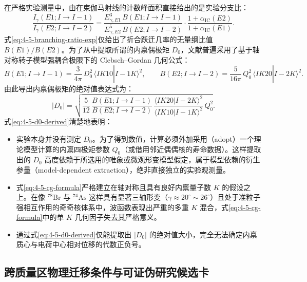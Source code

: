在严格实验测量中，由在束伽马射线的计数峰面积直接给出的是实验分支比：
\begin{equation}\label{eq:4-5-branching-ratio-exp}
\frac{I_\gamma(E1; I \to I-1)}{I_\gamma(E2; I \to I-2)} = \frac{E_{\gamma, E1}^3\,B(E1; I \to I-1)}{E_{\gamma, E2}^5\,B(E2; I \to I-2)} \cdot \frac{1 + \alpha_{\mathrm{IC}}(E2)}{1 + \alpha_{\mathrm{IC}}(E1)} .
\end{equation}
式\eqref{eq:4-5-branching-ratio-exp}仅给出了折合跃迁几率的无量纲比值 $B(E1)/B(E2)$。为了从中提取所谓的内禀偶极矩 $D_0$，文献普遍采用了基于轴对称转子模型强耦合极限下的 Clebsch--Gordan 几何公式：
\begin{equation}\label{eq:4-5-cg-formula}
B(E1; I \to I-1) = \frac{3}{4\pi}\,D_0^2\,\langle I K 1 0 | I-1 K \rangle^2 , \qquad
B(E2; I \to I-2) = \frac{5}{16\pi}\,Q_0^2\,\langle I K 2 0 | I-2 K \rangle^2 .
\end{equation}
由此导出内禀偶极矩的绝对值表达式为：
\begin{equation}\label{eq:4-5-d0-derived}
|D_0| = \sqrt{\frac{5}{12}\,\frac{B(E1; I \to I-1)}{B(E2; I \to I-2)}\,\frac{\langle I K 2 0 | I-2 K \rangle^2}{\langle I K 1 0 | I-1 K \rangle^2}\,Q_0^2} .
\end{equation}
式\eqref{eq:4-5-d0-derived}清楚地表明：
\begin{itemize}
\item 实验本身并没有测定 $D_0$。为了得到数值，计算必须外加采用（adopt）一个理论模型计算的内禀四极矩参数 $Q_0$（或借用邻近偶偶核的寿命数据）。这样提取出的 $D_0$ 高度依赖于所选用的唯象或微观形变模型假定，属于模型依赖的衍生参量（model-dependent extraction），绝非直接独立的实验观测量。
\item 式\eqref{eq:4-5-cg-formula}严格建立在轴对称且具有良好内禀量子数 $K$ 的假设之上。在像 $^{78}\mathrm{Br}$ 与 $^{74}\mathrm{As}$ 这样具有显著三轴形变（$\gamma \approx 20^\circ\sim 26^\circ$）且处于准粒子强相互作用的奇奇核体系中，波函数表现出严重的多重 $K$ 混合，式\eqref{eq:4-5-cg-formula}中的单 $K$ 几何因子失去其严格意义。
\item 通过式\eqref{eq:4-5-d0-derived}仅能提取出 $|D_0|$ 的绝对值大小，完全无法确定内禀质心与电荷中心相对位移的代数正负号。
\end{itemize}

\subsection{跨质量区物理迁移条件与可证伪研究候选卡}\label{sec:4-5-6}

